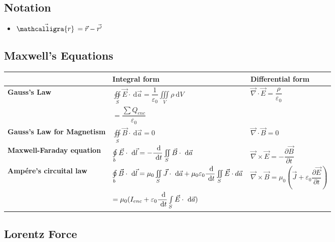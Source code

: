\documentclass[]{report}
\newcommand \tab[1][1cm]{\hspace*{#1}}
\newcommand{\dn}[1]{\ \mathrm{d}#1}
\newcommand{\dd}[2]{ \dfrac{\dn #1}{\dn #2}}
\newcommand{\pp}[2]{\dfrac{\partial #1}{\partial #2}}
\newcommand{\curl}{\vec{\nabla}\times}
\newcommand{\divergence}{\vec{\nabla}\cdot}
\newcommand{\itemt}{\item \tab}
\newcommand{\scriptr}{\mathcalligra{r}\,}
\begin{document}
		\subsection{Notation}
        \begin{itemize}
        \itemt \( \vec{\scriptr} = \vec{r} - \vec{r'} \)
        \end{itemize}

		\subsection{Maxwell's Equations}

\def\arraystretch{3}
\begin{tabular}{ |l|l|l| } 
\hline
					
  &	\textbf{Integral form}	& 	\textbf{Differential form}
\\ \hline

\textbf{Gauss's Law}	
&\( \oiint\limits_{S} \vec{E} \cdot \dn\vec{a} = \dfrac{1}{\varepsilon_0} \iiint\limits_V \rho \dn V \)	
& \( \divergence \vec{E} = \dfrac{\rho}{\varepsilon_0} \)
\\
& \hspace{1.4cm}\( = \dfrac{\sum Q_{enc}}{\varepsilon_0} \) &
\\ \hline

\textbf{Gauss's Law for Magnetism}	
&\( \oiint\limits_{S} \vec{B} \cdot \dn\vec{a} = 0 \)
&\( \divergence \vec{B} = 0 \)
\\ \hline

\textbf{Maxwell-Faraday equation}	
&\( \oint\limits_{b} \vec{E} \cdot \dn\vec{l} = -\dd{}{t} \iint\limits_S \vec{B} \cdot \dn\vec{a}\)	&\( \curl \vec{E} = -\pp{\vec{B}}{t} \)
\\ \hline

\textbf{Amp\'ere's circuital law}	
& \( \oint\limits_{b} \vec{B} \cdot \dn\vec{l} = \mu_0 \iint\limits_S \vec{J} \cdot \dn\vec{a} + \mu_0\varepsilon_0 \dd{}{t} \iint\limits_S \vec{E}\cdot d\vec{a}\)	
&\( \curl \vec{B} = \mu_0(\vec{J} + \varepsilon_0 \pp{\vec{E}}{t}) \)
\\
& \hspace{1.1cm} \( = \mu_0 (I_{enc} + \varepsilon_0 \dd{}{t} \int\limits_S \vec{E} \cdot \dn\vec{a} ) \) &
\\ \hline
\end{tabular}


		\subsection{Lorentz Force}
\end{document}
